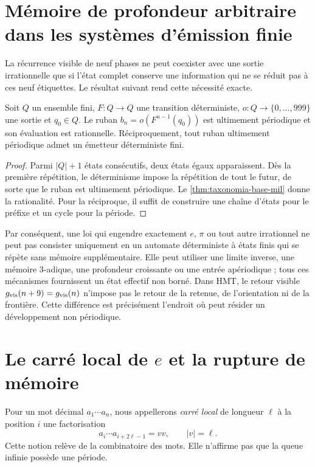 \section{Mémoire de profondeur arbitraire dans les systèmes d'émission finie}

La récurrence visible de neuf phases ne peut coexister avec une sortie
irrationnelle que si l'état complet conserve une information qui ne se réduit pas à
ces neuf étiquettes. Le résultat suivant rend cette nécessité exacte.

\begin{theorem}
\label{thm:emisor-finito-racional}
Soit \(Q\) un ensemble fini, \(F:Q\to Q\) une transition déterministe,
\(o:Q\to\{0,\ldots,999\}\) une sortie et \(q_0\in Q\). Le ruban
\(b_n=o(F^{n-1}(q_0))\) est ultimement périodique et son évaluation est rationnelle.
Réciproquement, tout ruban ultimement périodique admet un émetteur déterministe
fini.
\end{theorem}

\begin{proof}
Parmi \(|Q|+1\) états consécutifs, deux états égaux apparaissent. Dès la première
répétition, le déterminisme impose la répétition de tout le futur, de sorte que le
ruban est ultimement périodique. Le \cref{thm:taxonomia-base-mil} donne la
rationalité. Pour la réciproque, il suffit de construire une chaîne d'états pour le
préfixe et un cycle pour la période.
\end{proof}

Par conséquent, une loi qui engendre exactement \(e\), \(\pi\) ou tout autre
irrationnel ne peut pas consister uniquement en un automate déterministe à
états finis qui se répète sans mémoire supplémentaire. Elle peut utiliser une limite
inverse, une mémoire 3-adique, une profondeur croissante ou une entrée
apériodique ; tous ces mécanismes fournissent un état effectif non borné.
Dans HMT, le retour visible
\(g_{\rm vis}(n+9)=g_{\rm vis}(n)\) n'impose pas le retour de la retenue, de
l'orientation ni de la frontière. Cette différence est précisément l'endroit où
peut résider un développement non périodique.

\section{Le carré local de \texorpdfstring{\(e\)}{e} et la rupture de mémoire}

Pour un mot décimal \(a_1\cdots a_n\), nous appellerons \emph{carré local}
de longueur \(\ell\) à la position \(i\) une factorisation
\[
 a_i\cdots a_{i+2\ell-1}=vv,
 \qquad |v|=\ell.
\]
Cette notion relève de la combinatoire des mots. Elle n'affirme pas que la queue
infinie possède une période.

